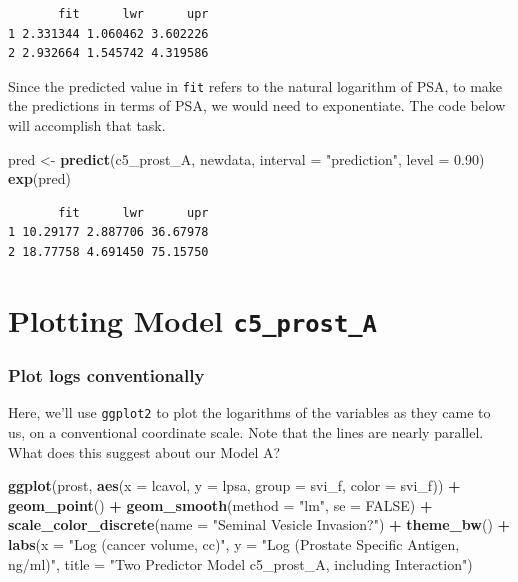 \documentclass[]{book}
\newenvironment{Shaded}{\begin{snugshade}}{\end{snugshade}}
\newcommand{\KeywordTok}[1]{\textcolor[rgb]{0.13,0.29,0.53}{\textbf{#1}}}
\newcommand{\DataTypeTok}[1]{\textcolor[rgb]{0.13,0.29,0.53}{#1}}
\newcommand{\FloatTok}[1]{\textcolor[rgb]{0.00,0.00,0.81}{#1}}
\newcommand{\StringTok}[1]{\textcolor[rgb]{0.31,0.60,0.02}{#1}}
\newcommand{\OtherTok}[1]{\textcolor[rgb]{0.56,0.35,0.01}{#1}}
\newcommand{\OperatorTok}[1]{\textcolor[rgb]{0.81,0.36,0.00}{\textbf{#1}}}
\newcommand{\NormalTok}[1]{#1}
\theoremstyle{definition}
\theoremstyle{definition}
\theoremstyle{definition}
\theoremstyle{remark}
\begin{document}
\begin{verbatim}
       fit      lwr      upr
1 2.331344 1.060462 3.602226
2 2.932664 1.545742 4.319586
\end{verbatim}

Since the predicted value in \texttt{fit} refers to the natural
logarithm of PSA, to make the predictions in terms of PSA, we would need
to exponentiate. The code below will accomplish that task.

\begin{Shaded}
\begin{Highlighting}[]
\NormalTok{pred <-}\StringTok{ }\KeywordTok{predict}\NormalTok{(c5_prost_A, newdata, }\DataTypeTok{interval =} \StringTok{"prediction"}\NormalTok{, }\DataTypeTok{level =} \FloatTok{0.90}\NormalTok{)}
\KeywordTok{exp}\NormalTok{(pred)}
\end{Highlighting}
\end{Shaded}

\begin{verbatim}
       fit      lwr      upr
1 10.29177 2.887706 36.67978
2 18.77758 4.691450 75.15750
\end{verbatim}

\section{\texorpdfstring{Plotting Model
\texttt{c5\_prost\_A}}{Plotting Model c5\_prost\_A}}\label{plotting-model-c5_prost_a}

\subsubsection{Plot logs conventionally}\label{plot-logs-conventionally}

Here, we'll use \texttt{ggplot2} to plot the logarithms of the variables
as they came to us, on a conventional coordinate scale. Note that the
lines are nearly parallel. What does this suggest about our Model A?

\begin{Shaded}
\begin{Highlighting}[]
\KeywordTok{ggplot}\NormalTok{(prost, }\KeywordTok{aes}\NormalTok{(}\DataTypeTok{x =}\NormalTok{ lcavol, }\DataTypeTok{y =}\NormalTok{ lpsa, }\DataTypeTok{group =}\NormalTok{ svi_f, }\DataTypeTok{color =}\NormalTok{ svi_f)) }\OperatorTok{+}
\StringTok{    }\KeywordTok{geom_point}\NormalTok{() }\OperatorTok{+}
\StringTok{    }\KeywordTok{geom_smooth}\NormalTok{(}\DataTypeTok{method =} \StringTok{"lm"}\NormalTok{, }\DataTypeTok{se =} \OtherTok{FALSE}\NormalTok{) }\OperatorTok{+}\StringTok{ }
\StringTok{    }\KeywordTok{scale_color_discrete}\NormalTok{(}\DataTypeTok{name =} \StringTok{"Seminal Vesicle Invasion?"}\NormalTok{) }\OperatorTok{+}
\StringTok{    }\KeywordTok{theme_bw}\NormalTok{() }\OperatorTok{+}
\StringTok{    }\KeywordTok{labs}\NormalTok{(}\DataTypeTok{x =} \StringTok{"Log (cancer volume, cc)"}\NormalTok{, }
         \DataTypeTok{y =} \StringTok{"Log (Prostate Specific Antigen, ng/ml)"}\NormalTok{, }
         \DataTypeTok{title =} \StringTok{"Two Predictor Model c5_prost_A, including Interaction"}\NormalTok{)}
\end{Highlighting}
\end{Shaded}
\end{document}
